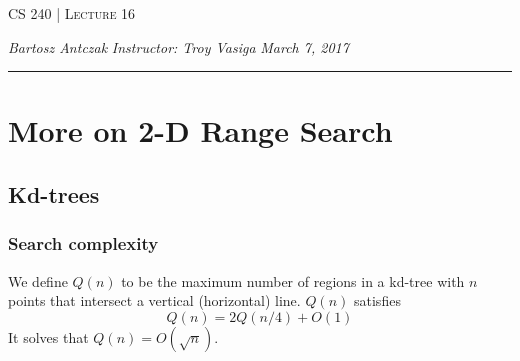\documentclass{report}
\newcommand{\lectureNum}{16}
\newcommand{\curDate}{March 7, 2017}
\newcommand{\course}{CS 240}
\begin{document}
\begin{center}
\begin{Large}
\textsc{\course{} | Lecture \lectureNum{}}
\end{Large}
\end{center} 
\noindent \textit{Bartosz Antczak} \hfill
\textit{Instructor: Troy Vasiga} \hfill
\textit{\curDate{}}
\rule{\textwidth}{0.4pt}

\section{More on 2-D Range Search}
\subsection{Kd-trees}
\subsubsection{Search complexity}
We define $Q(n)$ to be the maximum number of regions in a kd-tree with $n$ points that intersect a vertical (horizontal) line. $Q(n)$ satisfies
$$Q(n) = 2Q(n/4) + O(1)$$
It solves that $Q(n) = O(\sqrt{n})$.
\end{document}
